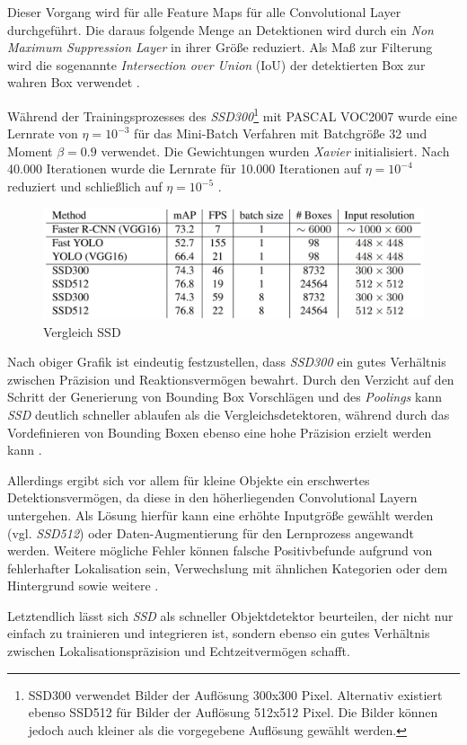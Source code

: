Dieser Vorgang wird für alle Feature Maps für alle Convolutional Layer durchgeführt. Die daraus folgende Menge an Detektionen wird durch ein \textit{Non Maximum Suppression Layer} in ihrer Größe reduziert. Als Maß zur Filterung wird die sogenannte \textit{Intersection over Union} (IoU) der detektierten Box zur wahren Box verwendet \cite{ssd.20161229}.

Während der Trainingsprozesses des \textit{SSD300}\footnote{SSD300 verwendet Bilder der Auflösung 300x300 Pixel. Alternativ existiert ebenso SSD512 für Bilder der Auflösung 512x512 Pixel. Die Bilder können jedoch auch kleiner als die vorgegebene Auflösung gewählt werden.} mit PASCAL VOC2007 wurde eine Lernrate von $\eta = 10^{-3}$ für das Mini-Batch Verfahren mit Batchgröße 32 und Moment $\beta = 0.9$ verwendet. Die Gewichtungen wurden \textit{Xavier} initialisiert. Nach 40.000 Iterationen wurde die Lernrate für 10.000 Iterationen auf $\eta = 10^{-4}$ reduziert und schließlich auf $\eta = 10^{-5}$ \cite{ssd.20161229}. 

\begin{figure}[ht]
	\begin{center}
		\includegraphics[width=12cm]{Bilder/ssd_results.png} 
		\caption[Vergleich SSD]{Vergleich SSD \cite{ssd.20161229}}
		\label{result}
	\end{center}
\end{figure}

Nach obiger Grafik ist eindeutig festzustellen, dass \textit{SSD300} ein gutes Verhältnis zwischen Präzision und Reaktionsvermögen bewahrt. Durch den Verzicht auf den Schritt der Generierung von Bounding Box Vorschlägen und des \textit{Poolings} kann \textit{SSD} deutlich schneller ablaufen als die Vergleichsdetektoren, während durch das Vordefinieren von Bounding Boxen ebenso eine hohe Präzision erzielt werden kann \cite{ssd.20161229}.

Allerdings ergibt sich vor allem für kleine Objekte ein erschwertes Detektionsvermögen, da diese in den höherliegenden Convolutional Layern untergehen. Als Lösung hierfür kann eine erhöhte Inputgröße gewählt werden (vgl. \textit{SSD512}) oder Daten-Augmentierung für den Lernprozess angewandt werden. Weitere mögliche Fehler können falsche Positivbefunde aufgrund von fehlerhafter Lokalisation sein, Verwechslung mit ähnlichen Kategorien oder dem Hintergrund sowie weitere \cite{ssd.20161229}.

Letztendlich lässt sich \textit{SSD} als schneller Objektdetektor beurteilen, der nicht nur einfach zu trainieren und integrieren ist, sondern ebenso ein gutes Verhältnis zwischen Lokalisationspräzision und Echtzeitvermögen schafft.
